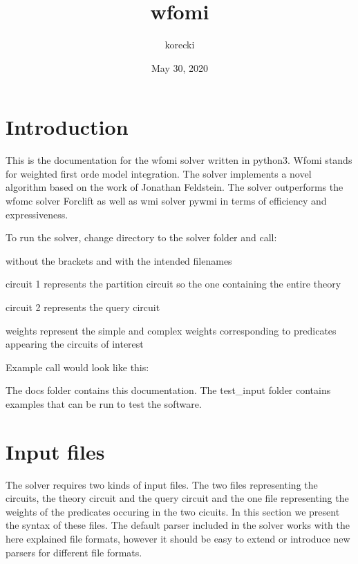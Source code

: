 \documentclass[letterpaper,10pt,english,openany,oneside]{sphinxmanual}
\title{wfomi}
\date{May 30, 2020}
\author{korecki}
\begin{document}
\pagestyle{empty}
\sphinxmaketitle
\pagestyle{plain}
\sphinxtableofcontents
\pagestyle{normal}
\label{\detokenize{index::doc}}



\chapter{Introduction}
\label{\detokenize{index:introduction}}
This is the documentation for the wfomi solver written in python3.
Wfomi stands for weighted first orde model integration.
The solver implements a novel algorithm based on the work of Jonathan Feldstein.
The solver outperforms the wfomc solver \sphinxhyphen{} Forclift as well as wmi solver \sphinxhyphen{} pywmi in terms of efficiency and expressiveness.

To run the solver, change directory to the solver folder and call:

\begin{sphinxVerbatim}[commandchars=\\\{\}]
\end{sphinxVerbatim}

without the brackets and with the intended filenames

\begin{DUlineblock}{0em}
\item[] circuit 1 represents the partition circuit so the one containing the entire theory
\item[] circuit 2 represents the query circuit
\item[] weights represent the simple and complex weights corresponding to predicates appearing the circuits of interest
\end{DUlineblock}

Example call would look like this:

\begin{sphinxVerbatim}[commandchars=\\\{\}]
\end{sphinxVerbatim}

The docs folder contains this documentation.
The test\_input folder contains examples that can be run to test the software.


\chapter{Input files}
\label{\detokenize{index:input-files}}
The solver requires two kinds of input files.
The two files representing the circuits, the theory circuit and the query circuit and the one file representing the weights of the predicates occuring in the two cicuits. In this section we present the syntax of these files. The default parser included in the solver works with the here explained file formats, however it should be easy to extend or introduce new parsers for different file formats.
\end{document}
